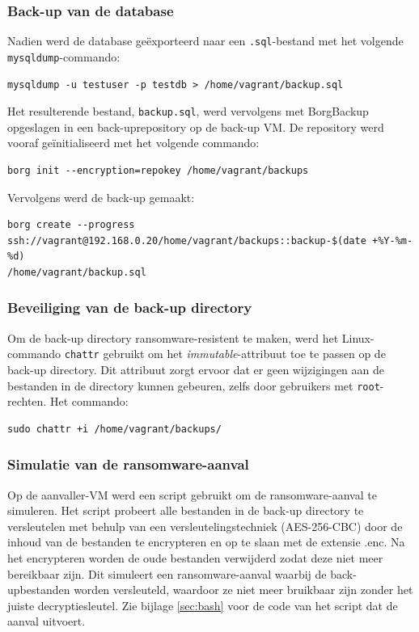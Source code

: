 \subsubsection{Back-up van de database}
Nadien werd de database geëxporteerd naar een \texttt{.sql}-bestand met het volgende \texttt{mysqldump}-commando:
\begin{lstlisting}[language=script, caption={Mysqldump commando om een databank te exporteren.}]
mysqldump -u testuser -p testdb > /home/vagrant/backup.sql
\end{lstlisting}
Het resulterende bestand, \texttt{backup.sql}, werd vervolgens met BorgBackup opgeslagen in een back-uprepository op de back-up VM. De repository werd vooraf geïnitialiseerd met het volgende commando:
\begin{lstlisting}[language=script, caption={Borg commando om een map te initialiseren als Borg repository.}]
borg init --encryption=repokey /home/vagrant/backups
\end{lstlisting}
Vervolgens werd de back-up gemaakt:
\begin{lstlisting}[language=script, caption={Borg commando om een back-up te nemen.}]
borg create --progress 
ssh://vagrant@192.168.0.20/home/vagrant/backups::backup-$(date +%Y-%m-%d) 
/home/vagrant/backup.sql
\end{lstlisting}

\subsubsection{Beveiliging van de back-up directory}
Om de back-up directory ransomware-resistent te maken, werd het Linux-commando \texttt{chattr} gebruikt om het \textit{immutable}-attribuut toe te passen op de back-up directory. Dit attribuut zorgt ervoor dat er geen wijzigingen aan de bestanden in de directory kunnen gebeuren, zelfs door gebruikers met \texttt{root}-rechten. Het commando:
\begin{lstlisting}[language=script, caption={Linux commando om de map immutable te maken.}]
sudo chattr +i /home/vagrant/backups/
\end{lstlisting}

\subsubsection{Simulatie van de ransomware-aanval}
Op de aanvaller-VM werd een script gebruikt om de ransomware-aanval te simuleren. Het script probeert alle bestanden in de back-up directory te versleutelen met behulp van een versleutelingstechniek (AES-256-CBC) door de inhoud van de bestanden te encrypteren en op te slaan met de extensie .enc. Na het encrypteren worden de oude bestanden verwijderd zodat deze niet meer bereikbaar zijn. Dit simuleert een ransomware-aanval waarbij de back-upbestanden worden versleuteld, waardoor ze niet meer bruikbaar zijn zonder het juiste decryptiesleutel. Zie bijlage \ref{sec:bash} voor de code van het script dat de aanval uitvoert.


